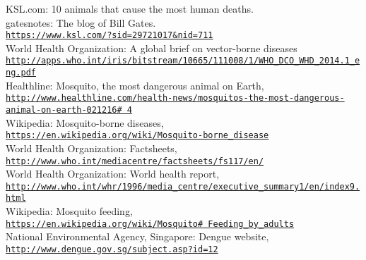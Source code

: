 \documentclass[11pt]{exam}
\begin{document}
\begin{questions}

\end{questions}
\newpage
\begin{thebibliography}{28}
KSL.com: 10 animals that cause the most human deaths. \\
gatesnotes: The blog of Bill Gates. 
\\\texttt{\url{https://www.ksl.com/?sid=29721017&nid=711}} \\

World Health Organization: A global brief on vector-borne diseases
\\\texttt{\url{http://apps.who.int/iris/bitstream/10665/111008/1/WHO_DCO_WHD_2014.1_eng.pdf}}\\
 
Healthline: Mosquito, the most dangerous animal on Earth,
\\\texttt{\url{http://www.healthline.com/health-news/mosquitos-the-most-dangerous-animal-on-earth-021216\# 4}} \\
 
Wikipedia: Mosquito-borne diseases,
\\\texttt{\url{https://en.wikipedia.org/wiki/Mosquito-borne_disease}} \\
 
World Health Organization: Factsheets,
\\\texttt{\url{http://www.who.int/mediacentre/factsheets/fs117/en/}}\\
 
World Health Organization: World health report,
\\\texttt{\url{http://www.who.int/whr/1996/media_centre/executive_summary1/en/index9.html}} \\
 
Wikipedia: Mosquito feeding,
\\\texttt{\url{https://en.wikipedia.org/wiki/Mosquito\# Feeding_by_adults}}\\
 
National Environmental Agency, Singapore: Dengue website, 
\\\texttt{\url{http://www.dengue.gov.sg/subject.asp?id=12}} \\


\end{thebibliography}
\end{document}
